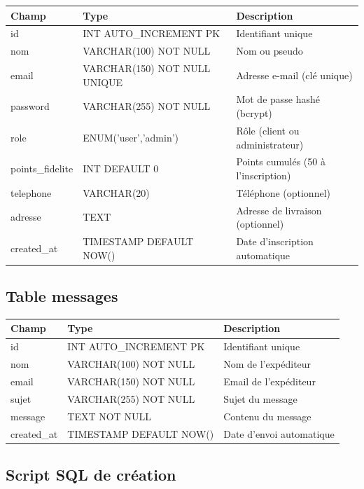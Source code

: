 \documentclass[a4paper,12pt]{article}
\begin{document}
\begin{center}
\renewcommand{\arraystretch}{1.4}
\begin{tabular}{|l|l|l|}
\hline
\textbf{Champ} & \textbf{Type} & \textbf{Description} \\
\hline
id & INT AUTO\_INCREMENT PK & Identifiant unique \\
nom & VARCHAR(100) NOT NULL & Nom ou pseudo \\
email & VARCHAR(150) NOT NULL UNIQUE & Adresse e-mail (clé unique) \\
password & VARCHAR(255) NOT NULL & Mot de passe hashé (bcrypt) \\
role & ENUM('user','admin') & Rôle (client ou administrateur) \\
points\_fidelite & INT DEFAULT 0 & Points cumulés (50 à l'inscription) \\
telephone & VARCHAR(20) & Téléphone (optionnel) \\
adresse & TEXT & Adresse de livraison (optionnel) \\
created\_at & TIMESTAMP DEFAULT NOW() & Date d'inscription automatique \\
\hline
\end{tabular}
\end{center}

\subsection{Table messages}

\begin{center}
\renewcommand{\arraystretch}{1.4}
\begin{tabular}{|l|l|l|}
\hline
\textbf{Champ} & \textbf{Type} & \textbf{Description} \\
\hline
id & INT AUTO\_INCREMENT PK & Identifiant unique \\
nom & VARCHAR(100) NOT NULL & Nom de l'expéditeur \\
email & VARCHAR(150) NOT NULL & Email de l'expéditeur \\
sujet & VARCHAR(255) NOT NULL & Sujet du message \\
message & TEXT NOT NULL & Contenu du message \\
created\_at & TIMESTAMP DEFAULT NOW() & Date d'envoi automatique \\
\hline
\end{tabular}
\end{center}

\subsection{Script SQL de création}
\end{document}
